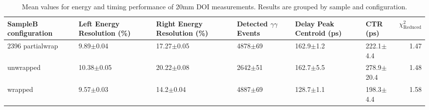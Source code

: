 \begin{table}
\caption{\label{doictrresults-20} Mean values for energy and timing performance of 20mm DOI measurements. Results are grouped by sample and configuration.}
\begin{tabular}{llllllr}
\hline
SampleB configuration & Left Energy Resolution (\%) & Right Energy Resolution (\%) & Detected $\gamma\gamma$ Events & Delay Peak Centroid (ps)  & CTR (ps) &  $\chi^2_\text{Reduced}$ \\
\hline
2396    partialwrap   &        9.89$\pm$0.04 &   17.27$\pm$0.05 &  4878$\pm$69 &  162.9$\pm$1.2 &   222.1$\pm$4.4 &        1.47 \\
        unwrapped     &       10.38$\pm$0.05 &   20.22$\pm$0.08 &  2642$\pm$51 &  162.7$\pm$5.5 &  278.9$\pm$20.4 &        1.48 \\
        wrapped       &        9.57$\pm$0.03 &    14.2$\pm$0.04 &  4887$\pm$69 &  128.7$\pm$1.1 &   198.3$\pm$4.4 &        1.58 \\
\hline
\end{tabular}
\end{table}